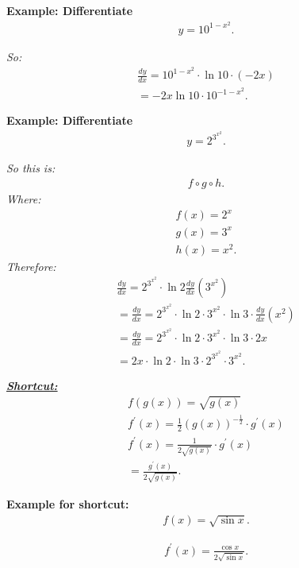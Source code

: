 \documentclass{report}
\begin{document}
  \begin{mdframed}
    \textbf{Example: Differentiate}
    \begin{align*}
      y = 10^{1-x^{2}}
    .\end{align*}
  \end{mdframed}
  \bigbreak \noindent 
  \textit{So:}
  \begin{align*}
    \frac{dy}{dx} = 10^{1-x^{2}} \cdot \ln{10} \cdot (-2x) \\
    = -2x \ln{10} \cdot 10^{-1-x^{2}}
  .\end{align*}

  \begin{mdframed}
    \textbf{Example: Differentiate}
    \begin{align*}
      y = 2^{3^{x^{2}}}
    .\end{align*}
  \end{mdframed}
  \bigbreak \noindent 
  \textit{So this is:}
  \begin{align*}
    f \circ g \circ h
  .\end{align*}
  \bigbreak \noindent 
  \textit{Where:}
  \begin{align*}
    f(x) = 2^{x}\\
    g(x) = 3^{x} \\
    h(x) = x^{2}
  .\end{align*}
  \bigbreak \noindent 
  \textit{Therefore:}
  \begin{align*}
    \frac{dy}{dx} = 2^{3^{x^{2}}} \cdot \ln{2} \frac{dy}{dx}(3^{x^{2}}) \\
    =\frac{dy}{dx} = 2^{3^{x^{2}}} \cdot \ln{2} \cdot 3^{x^{2}} \cdot \ln{3}  \cdot \frac{dy}{dx}(x^{2}) \\
    =\frac{dy}{dx} = 2^{3^{x^{2}}} \cdot \ln{2} \cdot 3^{x^{2}} \cdot \ln{3} \cdot 2x \\ 
    = 2x\cdot \ln{2}\cdot \ln{3}\cdot 2^{3^{x^{2}}} \cdot 3^{x^{2}} 
  .\end{align*}

  \bigbreak \noindent 
  \begin{mdframed}
    \textbf{\textit{\underline{Shortcut:}}}
    \begin{align*}
      f(g(x)) = \sqrt{g(x)} \\
      f^{\prime}(x)= \frac{1}{2}(g(x))^{-\frac{1}{2}} \cdot g^{\prime}(x) \\
      f^{\prime}(x) = \frac{1}{2\sqrt{g(x)}} \cdot g^{\prime}(x) \\
      = \frac{g^{\prime}(x)}{2\sqrt{g(x)}}
    .\end{align*}
  \end{mdframed}
  \bigbreak \noindent 
  \begin{mdframed}
    \textbf{Example for shortcut:}
    \begin{align*}
      f(x) = \sqrt{\sin{x}}
    .\end{align*}
  \end{mdframed}
  \bigbreak \noindent 
  \begin{align*}
    f^{\prime}(x) = \frac{\cos{x}}{2\sqrt{\sin{x}}}
  .\end{align*}
\end{document}
